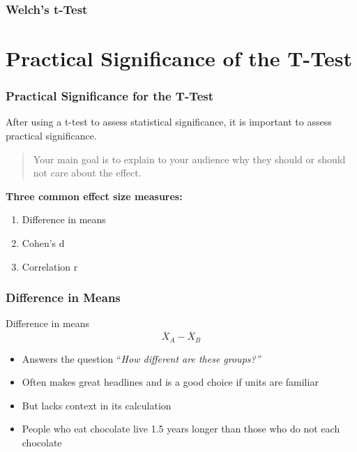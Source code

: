 \documentclass[12pt, block=fill]{beamer}
\begin{document}
\begin{frame}
  \frametitle{Welch's t-Test}
\end{frame}





\section{Practical Significance of the T-Test}
\begin{frame}
  \frametitle{Practical Significance for the T-Test}

  After using a t-test to assess statistical significance, it is
  important to assess practical significance. \\ \vspace{1em}

  \begin{quote}
    Your main goal is to explain to your audience
    why they should or should not care about the effect.
  \end{quote}

  \textbf{Three common effect size measures:}

  \begin{enumerate}
  \item Difference in means
  \item Cohen's d
  \item Correlation r
  \end{enumerate}
\end{frame}

\begin{frame}
  \frametitle{Difference in Means}

  \begin{block}{Difference in means}
    \[
      \overline{X}_{A} - \overline{X}_{B}
    \]
  \end{block}
    \begin{itemize}
    \item Answers the question ``\textit{How different are these
        groups?''}
    \item Often makes great headlines
      and is a good choice if units are familiar
    \item But lacks context in its calculation
  \item People who eat chocolate live 1.5 years longer than those who
    do not each chocolate
  \end{itemize}
\end{frame}
\end{document}
